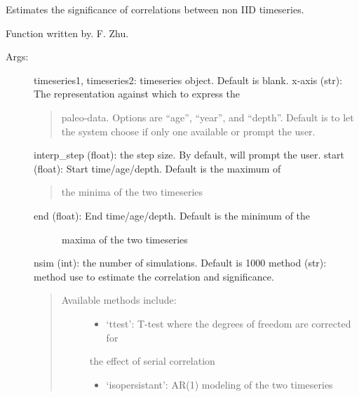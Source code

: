 \documentclass[letterpaper,10pt,english]{sphinxmanual}
\begin{document}
\begin{fulllineitems}
\label{\detokenize{Main:pyleoclim.corrSigTs}}
Estimates the significance of correlations between non IID timeseries.

Function written by. F. Zhu.
\begin{description}
\item[{Args:}] \leavevmode
timeseries1, timeseries2: timeseries object. Default is blank.
x-axis (str): The representation against which to express the
\begin{quote}

paleo-data. Options are “age”, “year”, and “depth”.
Default is to let the system choose if only one available
or prompt the user.
\end{quote}

interp\_step (float): the step size. By default, will prompt the user.
start (float): Start time/age/depth. Default is the maximum of
\begin{quote}

the minima of the two timeseries
\end{quote}
\begin{description}
\item[{end (float): End time/age/depth. Default is the minimum of the}] \leavevmode
maxima of the two timeseries

\end{description}

nsim (int): the number of simulations. Default is 1000
method (str): method use to estimate the correlation and significance.
\begin{quote}
\begin{description}
\item[{Available methods include:}] \leavevmode\begin{itemize}
\item {} 
‘ttest’: T-test where the degrees of freedom are corrected for

\end{itemize}

the effect of serial correlation
\begin{itemize}
\item {} 
‘isopersistant’: AR(1) modeling of the two timeseries


\end{itemize}
\end{description}
\end{quote}
\end{description}
\end{fulllineitems}
\end{document}
